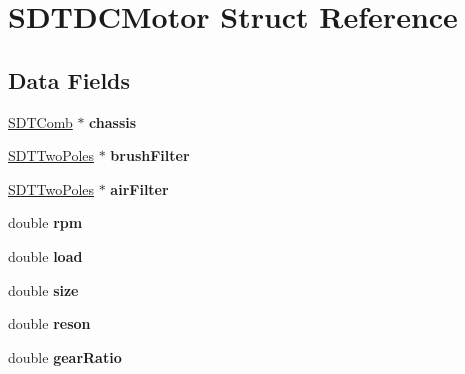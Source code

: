 \hypertarget{struct_s_d_t_d_c_motor}{}\section{S\+D\+T\+D\+C\+Motor Struct Reference}
\label{struct_s_d_t_d_c_motor}
\subsection*{Data Fields}
\begin{DoxyCompactItemize}
\item 
\hypertarget{struct_s_d_t_d_c_motor_afb92c7363c116c227fdfec0882d13732}{}\hyperlink{struct_s_d_t_comb}{S\+D\+T\+Comb} $\ast$ {\bfseries chassis}\label{struct_s_d_t_d_c_motor_afb92c7363c116c227fdfec0882d13732}

\item 
\hypertarget{struct_s_d_t_d_c_motor_a57986ece5f8aab88869e2f47f83e8832}{}\hyperlink{struct_s_d_t_two_poles}{S\+D\+T\+Two\+Poles} $\ast$ {\bfseries brush\+Filter}\label{struct_s_d_t_d_c_motor_a57986ece5f8aab88869e2f47f83e8832}

\item 
\hypertarget{struct_s_d_t_d_c_motor_ab650d6e618eb06e8c5ff0dbc932bd038}{}\hyperlink{struct_s_d_t_two_poles}{S\+D\+T\+Two\+Poles} $\ast$ {\bfseries air\+Filter}\label{struct_s_d_t_d_c_motor_ab650d6e618eb06e8c5ff0dbc932bd038}

\item 
\hypertarget{struct_s_d_t_d_c_motor_a2011bcb5a241d16e96a52766cecd7be3}{}double {\bfseries rpm}\label{struct_s_d_t_d_c_motor_a2011bcb5a241d16e96a52766cecd7be3}

\item 
\hypertarget{struct_s_d_t_d_c_motor_a8a23f389715acfc88ae4000ab00600f0}{}double {\bfseries load}\label{struct_s_d_t_d_c_motor_a8a23f389715acfc88ae4000ab00600f0}

\item 
\hypertarget{struct_s_d_t_d_c_motor_aba3c5d750d5dbd6e86c11ecaca62885e}{}double {\bfseries size}\label{struct_s_d_t_d_c_motor_aba3c5d750d5dbd6e86c11ecaca62885e}

\item 
\hypertarget{struct_s_d_t_d_c_motor_acb544de8d3dfc6f86b0e117dbd68b80d}{}double {\bfseries reson}\label{struct_s_d_t_d_c_motor_acb544de8d3dfc6f86b0e117dbd68b80d}

\item 
\hypertarget{struct_s_d_t_d_c_motor_a1c7f052bd8bc7f3cdf72da82d934e7ef}{}double {\bfseries gear\+Ratio}\label{struct_s_d_t_d_c_motor_a1c7f052bd8bc7f3cdf72da82d934e7ef}


\end{DoxyCompactItemize}

